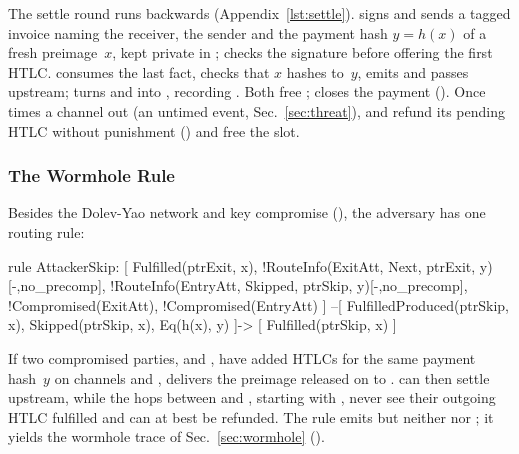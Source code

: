 The settle round runs backwards (Appendix~\ref{lst:settle}). 
signs and sends a tagged invoice naming the receiver, the sender and the payment hash
$y = h(x)$ of a fresh preimage~$x$, kept private in ;
 checks the signature before offering the first HTLC.
 consumes the last  fact, checks that $x$ hashes to~$y$,
emits  and passes  upstream;
 turns  and  into
, recording . Both free ;
 closes the payment (). Once  times a
channel out (an untimed event, Sec.~\ref{sec:threat}),  and
 refund its pending HTLC without punishment
() and free the slot.

\subsubsection{The Wormhole Rule}\label{sec:core-skip}
Besides the Dolev-Yao network and key compromise (), the adversary has one
routing rule:
\begin{spthy}
rule AttackerSkip:
    [ Fulfilled(ptrExit, x),
      !RouteInfo(ExitAtt, Next, ptrExit, y)[-,no_precomp],
      !RouteInfo(EntryAtt, Skipped, ptrSkip, y)[-,no_precomp],
      !Compromised(ExitAtt),
      !Compromised(EntryAtt) ]
    --[ FulfilledProduced(ptrSkip, x),
        Skipped(ptrSkip, x),
        Eq(h(x), y) ]->
    [ Fulfilled(ptrSkip, x) ]
\end{spthy}
If two compromised parties,  and , have added HTLCs for the same
payment hash~$y$ on channels  and ,  delivers the preimage released on  to .  can then
settle upstream, while the hops between  and , starting with
, never see their outgoing HTLC fulfilled and can at best be refunded. The rule
emits  but neither  nor ; it yields the
wormhole trace of Sec.~\ref{sec:wormhole} ().

